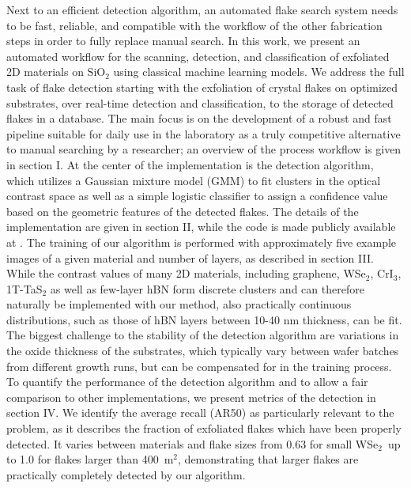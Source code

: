 \documentclass[reprint, prl, superscriptaddress, floatfix]{revtex4-2}
\newcommand{\WSe}{WSe$_2$}
\begin{document}
Next to an efficient detection algorithm, an automated flake search system needs to be fast, reliable, and compatible with the workflow of the other fabrication steps in order to fully replace manual search.
In this work, we present an automated workflow for the scanning, detection, and classification of exfoliated 2D materials on $\mathrm{SiO_2}$ using classical machine learning models. 
We address the full task of flake detection starting with the exfoliation of crystal flakes on optimized substrates, over real-time detection and classification, to the storage of detected flakes in a database.
The main focus is on the development of a robust and fast pipeline suitable for daily use in the laboratory as a truly competitive alternative to manual searching by a researcher; an overview of the process workflow is given in section I. 
At the center of the implementation is the detection algorithm, which utilizes a Gaussian mixture model (GMM) to fit clusters in the optical contrast space as well as a simple logistic classifier to assign a confidence value based on the geometric features of the detected flakes.
The details of the implementation are given in section II, while the code is made publicly available at \cite{code}.
The training of our algorithm is performed with approximately five example images of a given material and number of layers, as described in section III. 
While the contrast values of many 2D materials, including graphene, WSe$_2$, CrI$_3$, 1T-TaS$_2$ as well as few-layer hBN form discrete clusters and can therefore naturally be implemented with our method, also practically continuous distributions, such as those of hBN layers between 10-40 nm thickness, can be fit. 
The biggest challenge to the stability of the detection algorithm are variations in the oxide thickness of the substrates, which typically vary between wafer batches from different growth runs, but can be compensated for in the training process.  
To quantify the performance of the detection algorithm and to allow a fair comparison to other implementations, we present metrics of the detection in section IV.  
We identify the average recall (AR50) as particularly relevant to the problem, as it describes the fraction of exfoliated flakes which have been properly detected.
It varies between materials and flake sizes from 0.63 for small \WSe\ up to 1.0 for flakes larger than 400~\textmu m$^2$, demonstrating that larger flakes are practically completely detected by our algorithm.  
\end{document}
